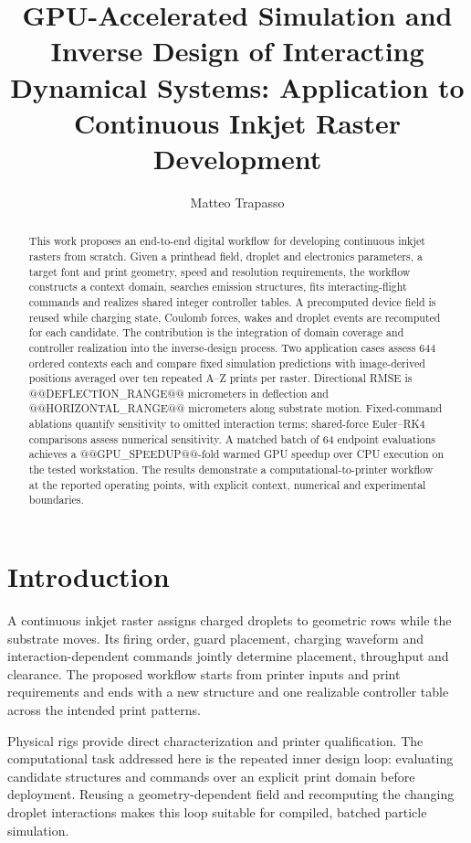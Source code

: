 \documentclass[11pt,letterpaper]{article}
\title{GPU-Accelerated Simulation and Inverse Design of Interacting Dynamical Systems: Application to Continuous Inkjet Raster Development}
\author{Matteo Trapasso}
\date{}
\begin{document}
\maketitle
\begin{abstract}
This work proposes an end-to-end digital workflow for developing continuous inkjet rasters from scratch. Given a printhead field, droplet and electronics parameters, a target font and print geometry, speed and resolution requirements, the workflow constructs a context domain, searches emission structures, fits interacting-flight commands and realizes shared integer controller tables. A precomputed device field is reused while charging state, Coulomb forces, wakes and droplet events are recomputed for each candidate. The contribution is the integration of domain coverage and controller realization into the inverse-design process. Two application cases assess 644 ordered contexts each and compare fixed simulation predictions with image-derived positions averaged over ten repeated A--Z prints per raster. Directional RMSE is @@DEFLECTION_RANGE@@ micrometers in deflection and @@HORIZONTAL_RANGE@@ micrometers along substrate motion. Fixed-command ablations quantify sensitivity to omitted interaction terms; shared-force Euler--RK4 comparisons assess numerical sensitivity. A matched batch of 64 endpoint evaluations achieves a @@GPU_SPEEDUP@@-fold warmed GPU speedup over CPU execution on the tested workstation. The results demonstrate a computational-to-printer workflow at the reported operating points, with explicit context, numerical and experimental boundaries.
\end{abstract}

\section{Introduction}
A continuous inkjet raster assigns charged droplets to geometric rows while the substrate moves. Its firing order, guard placement, charging waveform and interaction-dependent commands jointly determine placement, throughput and clearance. The proposed workflow starts from printer inputs and print requirements and ends with a new structure and one realizable controller table across the intended print patterns.

Physical rigs provide direct characterization and printer qualification. The computational task addressed here is the repeated inner design loop: evaluating candidate structures and commands over an explicit print domain before deployment. Reusing a geometry-dependent field and recomputing the changing droplet interactions makes this loop suitable for compiled, batched particle simulation.
\end{document}
